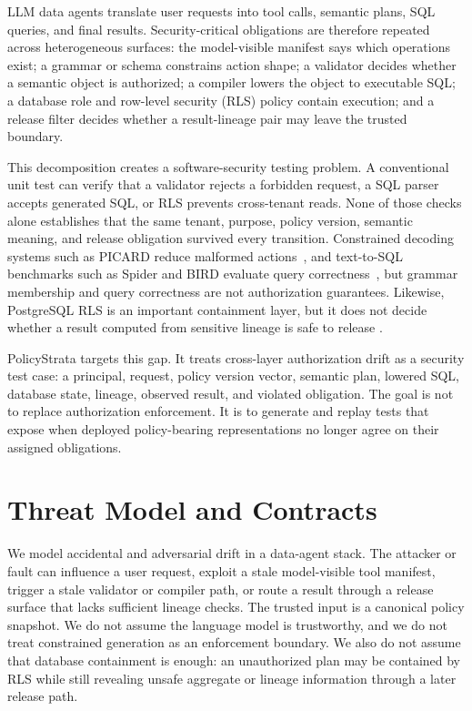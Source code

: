 \documentclass[sigconf,review,anonymous]{acmart}
\newcommand{\tool}{PolicyStrata}
\begin{document}
LLM data agents translate user requests into tool calls, semantic plans, SQL
queries, and final results. Security-critical obligations are therefore repeated
across heterogeneous surfaces: the model-visible manifest says which operations
exist; a grammar or schema constrains action shape; a validator decides whether a
semantic object is authorized; a compiler lowers the object to executable SQL; a
database role and row-level security (RLS) policy contain execution; and a
release filter decides whether a result-lineage pair may leave the trusted
boundary.

This decomposition creates a software-security testing problem. A conventional
unit test can verify that a validator rejects a forbidden request, a SQL parser
accepts generated SQL, or RLS prevents cross-tenant reads. None of those checks
alone establishes that the same tenant, purpose, policy version, semantic
meaning, and release obligation survived every transition. Constrained decoding
systems such as PICARD reduce malformed actions~\cite{picard}, and text-to-SQL
benchmarks such as Spider and BIRD evaluate query correctness~\cite{spider,bird},
but grammar membership and query correctness are not authorization guarantees.
Likewise, PostgreSQL RLS is an important containment layer, but it does not
decide whether a result computed from sensitive lineage is safe to release
\cite{postgresql_rls}.

\tool{} targets this gap. It treats cross-layer authorization drift as a
security test case: a principal, request, policy version vector, semantic plan,
lowered SQL, database state, lineage, observed result, and violated obligation.
The goal is not to replace authorization enforcement. It is to generate and
replay tests that expose when deployed policy-bearing representations no longer
agree on their assigned obligations.

\section{Threat Model and Contracts}

We model accidental and adversarial drift in a data-agent stack. The attacker or
fault can influence a user request, exploit a stale model-visible tool manifest,
trigger a stale validator or compiler path, or route a result through a release
surface that lacks sufficient lineage checks. The trusted input is a canonical
policy snapshot. We do not assume the language model is trustworthy, and we do
not treat constrained generation as an enforcement boundary. We also do not
assume that database containment is enough: an unauthorized plan may be contained
by RLS while still revealing unsafe aggregate or lineage information through a
later release path.
\end{document}
